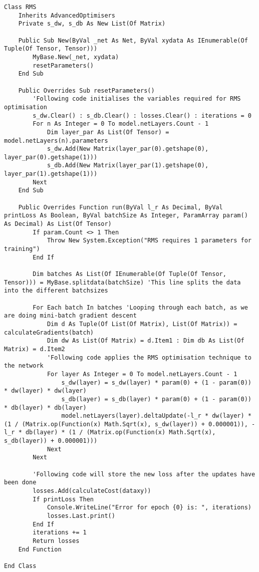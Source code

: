 \begin{verbatim}
Class RMS
    Inherits AdvancedOptimisers
    Private s_dw, s_db As New List(Of Matrix)

    Public Sub New(ByVal _net As Net, ByVal xydata As IEnumerable(Of Tuple(Of Tensor, Tensor)))
        MyBase.New(_net, xydata)
        resetParameters()
    End Sub

    Public Overrides Sub resetParameters()
        'Following code initialises the variables required for RMS optimisation
        s_dw.Clear() : s_db.Clear() : losses.Clear() : iterations = 0
        For n As Integer = 0 To model.netLayers.Count - 1
            Dim layer_par As List(Of Tensor) = model.netLayers(n).parameters
            s_dw.Add(New Matrix(layer_par(0).getshape(0), layer_par(0).getshape(1)))
            s_db.Add(New Matrix(layer_par(1).getshape(0), layer_par(1).getshape(1)))
        Next
    End Sub

    Public Overrides Function run(ByVal l_r As Decimal, ByVal printLoss As Boolean, ByVal batchSize As Integer, ParamArray param() As Decimal) As List(Of Tensor)
        If param.Count <> 1 Then
            Throw New System.Exception("RMS requires 1 parameters for training")
        End If

        Dim batches As List(Of IEnumerable(Of Tuple(Of Tensor, Tensor))) = MyBase.splitdata(batchSize) 'This line splits the data into the different batchsizes

        For Each batch In batches 'Looping through each batch, as we are doing mini-batch gradient descent
            Dim d As Tuple(Of List(Of Matrix), List(Of Matrix)) = calculateGradients(batch)
            Dim dw As List(Of Matrix) = d.Item1 : Dim db As List(Of Matrix) = d.Item2
            'Following code applies the RMS optimisation technique to the network
            For layer As Integer = 0 To model.netLayers.Count - 1
                s_dw(layer) = s_dw(layer) * param(0) + (1 - param(0)) * dw(layer) * dw(layer)
                s_db(layer) = s_db(layer) * param(0) + (1 - param(0)) * db(layer) * db(layer)
                model.netLayers(layer).deltaUpdate(-l_r * dw(layer) * (1 / (Matrix.op(Function(x) Math.Sqrt(x), s_dw(layer)) + 0.000001)), -l_r * db(layer) * (1 / (Matrix.op(Function(x) Math.Sqrt(x), s_db(layer)) + 0.000001)))
            Next
        Next

        'Following code will store the new loss after the updates have been done
        losses.Add(calculateCost(dataxy))
        If printLoss Then
            Console.WriteLine("Error for epoch {0} is: ", iterations)
            losses.Last.print()
        End If
        iterations += 1
        Return losses
    End Function

End Class
\end{verbatim}
